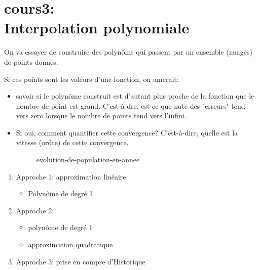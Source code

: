 \chapter{cours3:\\Interpolation polynomiale}
On va essayer de construire des polynôms qui passent par un ensemble (nuages) de points donnés.

Si ces points sont les valeurs d'une fonction, on amerait:
\begin{itemize}
    \item savoir si le polynôme construit est d'autant plus proche de la fonction que le nombre de point est grand. C'est-à-dre, est-ce que nute des "erreurs" tend vers zero lorsque le nombre de points tend vers l'infini.
    \item Si oui, comment quantifier cette convergence? C'est-à-dire, quelle est la vitesse (ordre) de cette convergence.
        \begin{figure}[H]
            \centering
            \caption{evolution-de-population-en-annee}
            \label{fig:evolution-de-population-en-annee}
        \end{figure}
\end{itemize}
\begin{enumerate}
    \item Approche 1: approximation linéaire. 
        \begin{itemize}
            \item Polynôme de degré 1
        \end{itemize}
    \item Approche 2: 
        \begin{itemize}
            \item polynôme de degré 1
            \item approximation quadratique
        \end{itemize}
    \item Approche 3: prise en compre d'Historique
\end{enumerate}

